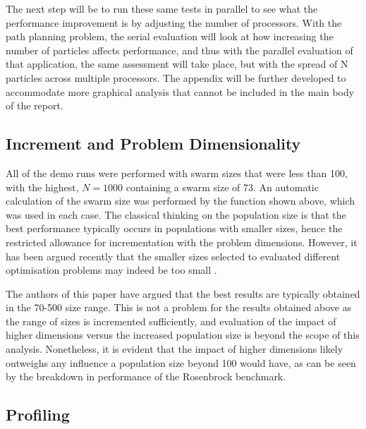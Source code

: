 \documentclass[KomodoMain.tex]{subfiles}
\begin{document}
\newpage

\begin{remark}
The next step will be to run these same tests in parallel to see what the performance improvement is by adjusting the number of processors. With the path planning problem, the serial evaluation will look at how increasing the number of particles affects performance, and thus with the parallel evaluation of that application, the same assessment will take place, but with the spread of N particles across multiple processors. The appendix will be further developed to accommodate more graphical analysis that cannot be included in the main body of the report.
\end{remark}

\subsection{Increment and Problem Dimensionality}



All of the demo runs were performed with swarm sizes that were less than 100, with the highest, $N = 1000$ containing a swarm size of 73. An automatic calculation of the swarm size was performed by the function shown above, which was used in each case. The classical thinking on the population size is that the best performance typically occurs in populations with smaller sizes, hence the restricted allowance for incrementation with the problem dimensions. However, it has been argued recently that the smaller sizes selected to evaluated different optimisation problems may indeed be too small \cite{ssize}. 
\par
The authors of this paper have argued that the best results are typically obtained in the 70-500 size range. This is not a problem for the results obtained above as the range of sizes is incremented sufficiently, and evaluation of the impact of higher dimensions versus the increased population size is beyond the scope of this analysis. Nonetheless, it is evident that the impact of higher dimensions likely outweighs any influence a population size beyond 100 would have, as can be seen by the breakdown in performance of the Rosenbrock benchmark.


\subsection{Profiling}
\end{document}
